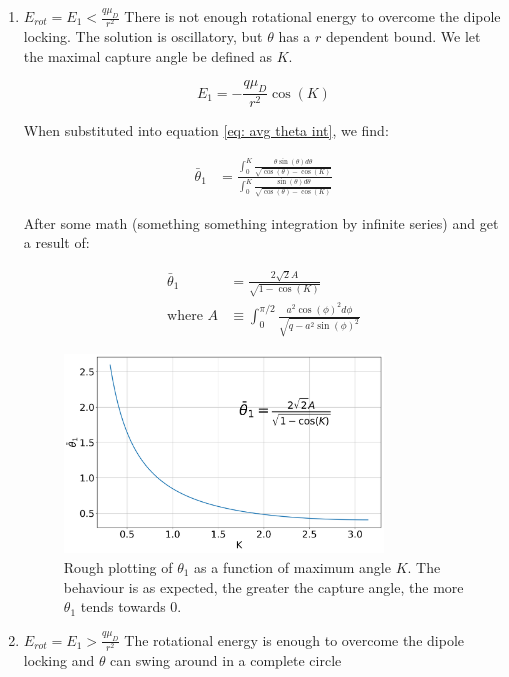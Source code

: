 \documentclass[a4paper]{article}
\begin{document}
\begin{enumerate}
\item $E_{rot} = E_1 < \frac{q \mu_D}{r^2}$
There is not enough rotational energy to overcome the dipole locking. The solution is oscillatory, but $\theta$ has a $r$ dependent bound. We let the maximal capture angle be defined as $K$.

$$ E_1=-\frac{q \mu_D}{r^2}\cos(K) $$

When substituted into equation \ref{eq: avg theta int}, we find:

\begin{align*}
    \bar{\theta}_1 & = \frac{\int_0^K \frac{\theta \sin(\theta) d \theta}{\sqrt{\cos(\theta) - \cos(K)}}}{\int_0^K \frac{\sin(\theta) d \theta}{\sqrt{\cos(\theta) - \cos(K)}}}
\end{align*}


After some math (something something integration by infinite series) and get a result of:

\begin{align*}
    \bar{\theta}_1 & = \frac{2 \sqrt{2}A}{\sqrt{1-\cos(K)}} \\
    \text{where }A & \equiv \int_0^{\pi/2} \frac{a^2 \cos(\phi)^2 d\phi}{\sqrt{q-a^2 \sin(\phi)^2}}
\end{align*}

\begin{figure}[H]
\label{fig: theta1}
\centering
\includegraphics[width=0.8\textwidth]{ADO_theta1.png}
\caption{Rough plotting of $\theta_1$ as a function of maximum angle $K$. The behaviour is as expected, the greater the capture angle, the more $\theta_1$ tends towards 0.}
\end{figure}

\item $E_{rot} = E_1 > \frac{q \mu_D}{r^2}$
The rotational energy is enough to overcome the dipole locking and $\theta$ can swing around in a complete circle


\end{enumerate}
\end{document}
